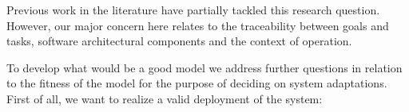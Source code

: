 




\setlength{\fboxsep}{10pt}
\noindent{}\bigskip

Previous work in the literature \cite{pessoa_dependable_2015} have partially tackled this research question. However, our major concern here relates to the traceability between goals and tasks, software architectural components and the context of operation.

To develop what would be a good model we address further questions in relation to the fitness of the model for the purpose of deciding on system adaptations. First of all, we want to realize a valid deployment of the system:

\setlength{\fboxsep}{10pt}
\noindent{}\bigskip

\setlength{\fboxsep}{10pt}
\noindent{}\bigskip
%
%

